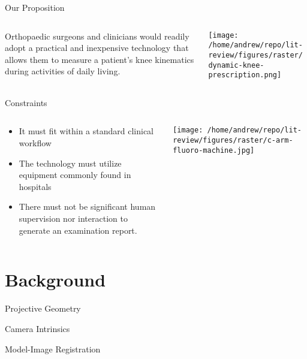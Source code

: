 \documentclass[presentation]{beamer}
\begin{document}
\begin{frame}[label={sec:orgc255a83}]{Our Proposition}
\begin{columns}
\begin{column}{0.5\columnwidth}
Orthopaedic surgeons and clinicians would readily adopt a practical and inexpensive technology that allows them to measure a patient's knee kinematics during activities of daily living.
\end{column}
\begin{column}{0.55\columnwidth}
\begin{center}
\texttt{[image: /home/andrew/repo/lit-review/figures/raster/dynamic-knee-prescription.png]}
\end{center}
\end{column}
\end{columns}
\end{frame}
\begin{frame}[label={sec:orgee10601}]{Constraints}
\begin{columns}
\begin{column}{0.45\columnwidth}
\begin{itemize}
\item It must fit within a standard clinical workflow
\item The technology must utilize equipment commonly found in hospitals
\item There must not be significant human supervision nor interaction to generate an examination report.
\end{itemize}
\end{column}
\begin{column}{0.55\columnwidth}
\begin{center}
\texttt{[image: /home/andrew/repo/lit-review/figures/raster/c-arm-fluoro-machine.jpg]}
\end{center}
\end{column}
\end{columns}
\end{frame}
\section{Background}
\label{sec:org7207dde}
\begin{frame}[label={sec:org3d0c759}]{Projective Geometry}
\end{frame}
\begin{frame}[label={sec:org213edb3}]{Camera Intrinsics}
\end{frame}
\begin{frame}[label={sec:org6819a4a}]{Model-Image Registration}
\end{frame}
\end{document}
